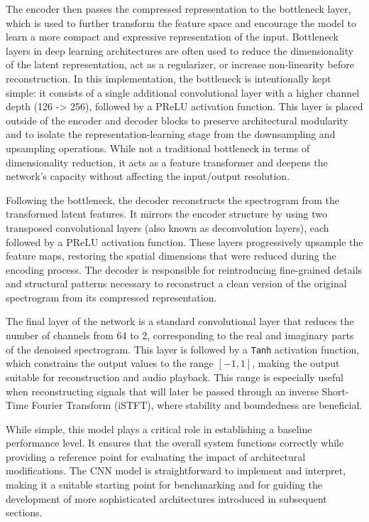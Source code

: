 The encoder then passes the compressed representation to the bottleneck layer, which is used to further transform the feature space and encourage the model to learn a more compact and expressive representation of the input. Bottleneck layers in deep learning architectures are often used to reduce the dimensionality of the latent representation, act as a regularizer, or increase non-linearity before reconstruction. In this implementation, the bottleneck is intentionally kept simple: it consists of a single additional convolutional layer with a higher channel depth (126 -> 256), followed by a PReLU activation function. This layer is placed outside of the encoder and decoder blocks to preserve architectural modularity and to isolate the representation-learning stage from the downsampling and upsampling operations. While not a traditional bottleneck in terms of dimensionality reduction, it acts as a feature transformer and deepens the network's capacity without affecting the input/output resolution.

Following the bottleneck, the decoder reconstructs the spectrogram from the transformed latent features. It mirrors the encoder structure by using two transposed convolutional layers (also known as deconvolution layers), each followed by a PReLU activation function. These layers progressively upsample the feature maps, restoring the spatial dimensions that were reduced during the encoding process. The decoder is responsible for reintroducing fine-grained details and structural patterns necessary to reconstruct a clean version of the original spectrogram from its compressed representation.

The final layer of the network is a standard convolutional layer that reduces the number of channels from 64 to 2, corresponding to the real and imaginary parts of the denoised spectrogram. This layer is followed by a \texttt{Tanh} activation function, which constrains the output values to the range \([-1, 1]\), making the output suitable for reconstruction and audio playback. This range is especially useful when reconstructing signals that will later be passed through an inverse Short-Time Fourier Transform (iSTFT), where stability and boundedness are beneficial.

While simple, this model plays a critical role in establishing a baseline performance level. It ensures that the overall system functions correctly while providing a reference point for evaluating the impact of architectural modifications. The CNN model is straightforward to implement and interpret, making it a suitable starting point for benchmarking and for guiding the development of more sophisticated architectures introduced in subsequent sections.

